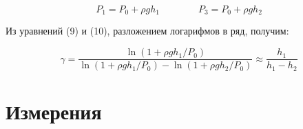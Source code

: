 \documentclass[a4paper]{article}
\begin{document}
\begin{equation}
    P_1 = P_0 + \rho gh_1 \qquad \qquad P_3 = P_0 + \rho gh_2
\end{equation}

Из уравнений (9) и (10), разложением логарифмов в ряд, получим:

\begin{equation}
    \gamma = \frac{\ln(1 + \rho gh_1 / P_0)}
                  {\ln(1 + \rho gh_1 / P_0) - \ln(1 + \rho gh_2 / P_0)} \approx 
             \frac{h_1}{h_1 - h_2}
\end{equation}

\section{Измерения}
                                                                                                                                                            

\end{document}
